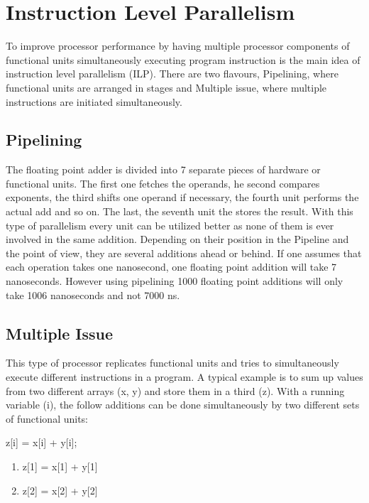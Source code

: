 \documentclass{article}
\begin{document}
\section{Instruction Level Parallelism} %
\label{sec:instruction_level_parallelism}
To improve processor performance by having multiple processor components of functional units simultaneously executing program instruction is the main idea of instruction level parallelism (ILP). There are two flavours, Pipelining, where functional units are arranged in stages and Multiple issue, where multiple instructions are initiated simultaneously.

\subsection{Pipelining} %
\label{sub:pipelining}
	The floating point adder is divided into 7 separate pieces of hardware or functional units.
	The first one fetches the operands, 
	he second compares exponents,
	the third shifts one operand if necessary,
	the fourth unit performs the actual add and so on.
	The last, the seventh unit the stores the result.
	With this type of parallelism every unit can be utilized better
	as none of them is ever involved in the same addition.
	Depending on their position in the Pipeline and the point of view,
	they are several additions ahead or behind.
	If one assumes that each operation takes one nanosecond,
	one floating point addition will take 7 nanoseconds.
	However using pipelining 1000 floating point additions will only take 1006 nanoseconds
	and not 7000 ns.

\subsection{Multiple Issue} %
\label{sub:multiple_issue}
	This type of processor replicates functional units
	and tries to simultaneously execute different instructions in a program.
	A typical example is to sum up values from two different arrays (x, y)
	and store them in a third (z).
	With a running variable (i),
	the follow additions can be done simultaneously by two different sets of functional units:\\
	\begin{center}
		z[i] = x[i] + y[i];
		\begin{enumerate}
			\item z[1] = x[1] + y[1]
			\item z[2] = x[2] + y[2]
		\end{enumerate}
	\end{center}
	
\end{document}

